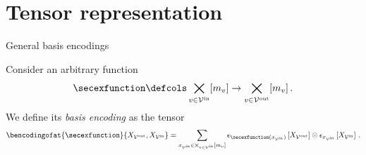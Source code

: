 \documentclass{beamer}
\begin{document}
%


    \section{Tensor representation}


    \begin{frame}{General basis encodings}


        Consider an arbitrary function
        \begin{align*}
            \secexfunction \defcols \bigtimes_{\node\in\innodes}[\catdimof{\node}] \rightarrow \bigtimes_{\node\in\outnodes}[\catdimof{\node}] \, .
        \end{align*}
        We define its \emph{basis encoding} as the tensor
        \begin{align*}
            \bencodingofat{\secexfunction}{
                \catvariableof{\outnodes},\catvariableof{\innodes}
            }
            = \sum_{\catindexof{\innodes}\in\bigtimes_{\node\in\innodes}[\catdimof{\node}]}
            \onehotmapofat{\secexfunction(\catindexof{\innodes})}{\catvariableof{\outnodes}}
            \otimes
            \onehotmapofat{\catindexof{\innodes}}{\catvariableof{\innodes}} \, .
        \end{align*}



    \end{frame}
\end{document}

